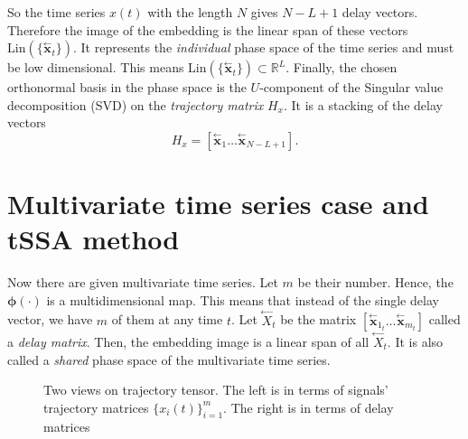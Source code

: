 \documentclass[referee, pdflatex, sn-mathphys-num]{sn-jnl}
\theoremstyle{definition}
\theoremstyle{plain}
\newcommand{\delayV}[1]{\overset{\leftarrow}{\mathbf{x}}_{#1}}
\newcommand{\delayM}[1]{\overset{\leftarrow}{X}_{#1}}
\begin{document}
	So the time series $ x(t) $ with the length $ N $ gives $ N - L + 1 $ delay vectors. Therefore the image of the embedding is the linear span of these vectors $ \text{Lin}(\{\delayV{t}\}) $. It represents the \emph{individual} phase space of the time series and must be low dimensional. This means $ \text{Lin}(\{\delayV{t}\}) \subset \mathbb{R}^L $. Finally, the chosen orthonormal basis in the phase space is the $ U $-component of the Singular value decomposition (SVD) on the \emph{trajectory matrix} $ H_x $. It is a stacking of the delay vectors	\[
		H_x = [ \delayV{1} \ldots  \delayV{N - L + 1}].
	\]
	
	\section{Multivariate time series case and tSSA method}\label{sec:tssa_method}
	
	Now there are given multivariate time series. Let $ m $ be their number. Hence, the $ \boldsymbol{\phi}(\cdot) $ is a multidimensional map. This means that instead of the single delay vector, we have $ m $ of them at any time $ t $. Let $ \delayM{t} $ be the matrix $ [ \delayV{1_t} \ldots \delayV{m_t} ] $ called a \emph{delay matrix}. Then, the embedding image is a linear span of all $ \delayM{t} $. It is also called a \emph{shared} phase space of the multivariate time series.
	
	\begin{figure}[!htbp]
		\centering
		
		\caption{Two views on trajectory tensor. The left is in terms of signals' trajectory matrices $ \{x_i(t)\}_{i=1}^m $. The right is in terms of delay matrices}\label{pic:traj_tensor}
	\end{figure}
	
\end{document}

